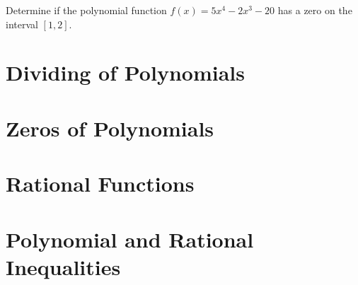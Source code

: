   \newpage
  
  \begin{example}
    Determine if the polynomial function $f(x)=5x^4-2x^3-20$ has a zero on the interval $[1, 2]$.
  \end{example}

\section{Dividing of Polynomials}

\section{Zeros of Polynomials}

\section{Rational Functions}

\section{Polynomial and Rational Inequalities}



